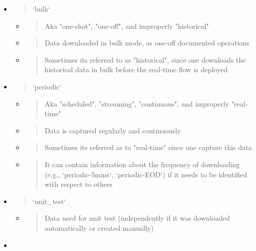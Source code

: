 \documentclass[11pt, reqno]{amsart}
\begin{document}
\begin{itemize}
\item
  \begin{quote}
  `bulk`
  \end{quote}

  \begin{itemize}
  \item
    \begin{quote}
    Aka "one-shot", "one-off", and improperly "historical"
    \end{quote}
  \item
    \begin{quote}
    Data downloaded in bulk mode, as one-off documented operations
    \end{quote}
  \item
    \begin{quote}
    Sometimes it\textquotesingle s referred to as "historical", since
    one downloads the historical data in bulk before the real-time flow
    is deployed
    \end{quote}
  \end{itemize}
\item
  \begin{quote}
  `periodic`
  \end{quote}

  \begin{itemize}
  \item
    \begin{quote}
    Aka "scheduled", "streaming", "continuous", and improperly
    "real-time"
    \end{quote}
  \item
    \begin{quote}
    Data is captured regularly and continuously
    \end{quote}
  \item
    \begin{quote}
    Sometimes it\textquotesingle s referred as to "real-time" since one
    capture this data
    \end{quote}
  \item
    \begin{quote}
    It can contain information about the frequency of downloading (e.g.,
    `periodic-5mins`, `periodic-EOD`) if it needs to be identified with
    respect to others
    \end{quote}
  \end{itemize}
\item
  \begin{quote}
  `unit\_test`
  \end{quote}

  \begin{itemize}
  \item
    \begin{quote}
    Data used for unit test (independently if it was downloaded
    automatically or created manually)
    \end{quote}
  \end{itemize}
\item
\end{itemize}
\end{document}
